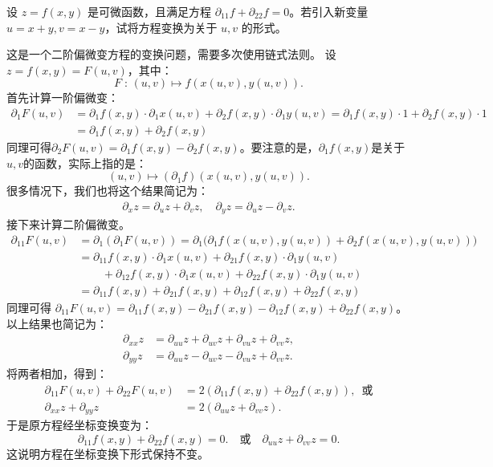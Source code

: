 \documentclass[12pt,UTF8]{ctexbook}
\begin{document}
\begin{et}
设 $z = f(x, y)$ 是可微函数，且满足方程 $\partial_{11} f + \partial_{22} f = 0$。若引入新变量 $u = x + y, v = x - y$，试将方程变换为关于 $u, v$ 的形式。
\end{et}
\begin{so}
这是一个二阶偏微变方程的变换问题，需要多次使用链式法则。
设$z = f(x,y) = F(u,v)$，其中：
$$ F\;:\, (u,v) \mapsto f(x(u,v),y(u,v)). $$
首先计算一阶偏微变：
\begin{align*}
    \partial_1 F(u,v) &= \partial_1 f(x,y)\cdot \partial_1 x(u,v) + \partial_2 f(x,y)\cdot \partial_1 y(u,v) =  \partial_1 f(x,y) \cdot 1 +  \partial_2 f(x,y) \cdot 1 \\
    &=  \partial_1 f(x,y) +  \partial_2 f(x,y)
\end{align*}
同理可得$\partial_2 F(u,v) = \partial_1 f(x,y) - \partial_2 f(x,y)$。要注意的是，$\partial_1 f(x,y)$是关于$u,v$的函数，实际上指的是：
$$ (u,v) \mapsto (\partial_1 f)(x(u,v),y(u,v)). $$
很多情况下，我们也将这个结果简记为：
\begin{align*}
\partial_x z = \partial_u z + \partial_v z, \quad \partial_y z = \partial_u z - \partial_v z.
\end{align*}
接下来计算二阶偏微变。
\begin{align*}
\partial_{11} F(u, v) &= \partial_1(\partial_1 F(u,v)) = \partial_1\Big(\partial_1 f(x(u,v),y(u,v)) +  \partial_2 f(x(u,v),y(u,v))\Big) \\
&= \partial_{11} f(x,y)\cdot  \partial_1 x(u,v) + \partial_{21} f(x,y)\cdot  \partial_1 y(u,v) \\
&\phantom{=+}+
 \partial_{12} f(x,y)\cdot  \partial_1 x(u,v) + \partial_{22} f(x,y)\cdot  \partial_1 y(u,v) \\
&=  \partial_{11} f(x,y) + \partial_{21} f(x,y) + \partial_{12} f(x,y) + \partial_{22} f(x,y)
\end{align*}
同理可得 $\partial_{11} F(u, v) = \partial_{11} f(x,y) - \partial_{21} f(x,y) - \partial_{12} f(x,y) + \partial_{22} f(x,y)$。以上结果也简记为：
\begin{align*}
\partial_{xx} z &= \partial_{uu} z + \partial_{uv} z + \partial_{vu} z + \partial_{vv} z, \\
\partial_{yy} z &= \partial_{uu} z - \partial_{uv} z - \partial_{vu} z + \partial_{vv} z.
\end{align*}
将两者相加，得到：
\begin{align*}
    \partial_{11} F(u, v) + \partial_{22} F(u, v) &= 2(\partial_{11} f(x,y) + \partial_{22} f(x,y)), \,\,\,\mbox{或}\\
     \partial_{xx} z + \partial_{yy} z &= 2(\partial_{uu} z + \partial_{vv} z).
\end{align*}
于是原方程经坐标变换变为：
$$ \partial_{11} f(x,y) + \partial_{22} f(x,y) = 0. \quad \mbox{或}\quad \partial_{uu} z + \partial_{vv} z = 0.$$
这说明方程在坐标变换下形式保持不变。
\end{so}
\end{document}
